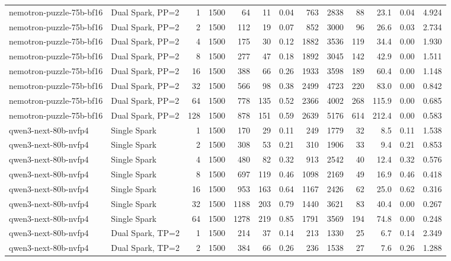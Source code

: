 \begin{tabular}{l l r r r r r r r r r r r}
nemotron-puzzle-75b-bf16 & Dual Spark, PP=2 & 1 & 1500 & 64\rlap{$^\dagger$} & 11 & 0.04 & 763 & 2838 & 88 & 23.1 & 0.04 & 4.924 \\
nemotron-puzzle-75b-bf16 & Dual Spark, PP=2 & 2 & 1500 & 112 & 19 & 0.07 & 852 & 3000 & 96 & 26.6 & 0.03 & 2.734 \\
nemotron-puzzle-75b-bf16 & Dual Spark, PP=2 & 4 & 1500 & 175 & 30 & 0.12 & 1882 & 3536 & 119 & 34.4 & 0.00 & 1.930 \\
nemotron-puzzle-75b-bf16 & Dual Spark, PP=2 & 8 & 1500 & 277 & 47 & 0.18 & 1892 & 3045 & 142 & 42.9 & 0.00 & 1.511 \\
nemotron-puzzle-75b-bf16 & Dual Spark, PP=2 & 16 & 1500 & 388 & 66 & 0.26 & 1933 & 3598 & 189 & 60.4 & 0.00 & 1.148 \\
nemotron-puzzle-75b-bf16 & Dual Spark, PP=2 & 32 & 1500 & 566 & 98 & 0.38 & 2499 & 4723 & 220 & 83.0 & 0.00 & 0.842 \\
nemotron-puzzle-75b-bf16 & Dual Spark, PP=2 & 64 & 1500 & 778 & 135 & 0.52 & 2366 & 4002 & 268 & 115.9 & 0.00 & 0.685 \\
nemotron-puzzle-75b-bf16 & Dual Spark, PP=2 & 128 & 1500 & 878 & 151 & 0.59 & 2639 & 5176 & 614 & 212.4 & 0.00 & 0.583 \\
\addlinespace
qwen3-next-80b-nvfp4 & Single Spark & 1 & 1500 & 170 & 29 & 0.11 & 249 & 1779 & 32 & 8.5 & 0.11 & 1.538 \\
qwen3-next-80b-nvfp4 & Single Spark & 2 & 1500 & 308 & 53 & 0.21 & 310 & 1906 & 33 & 9.4 & 0.21 & 0.853 \\
qwen3-next-80b-nvfp4 & Single Spark & 4 & 1500 & 480 & 82 & 0.32 & 913 & 2542 & 40 & 12.4 & 0.32 & 0.576 \\
qwen3-next-80b-nvfp4 & Single Spark & 8 & 1500 & 697 & 119 & 0.46 & 1098 & 2169 & 49 & 16.9 & 0.46 & 0.418 \\
qwen3-next-80b-nvfp4 & Single Spark & 16 & 1500 & 953 & 163 & 0.64 & 1167 & 2426 & 62 & 25.0 & 0.62 & 0.316 \\
qwen3-next-80b-nvfp4 & Single Spark & 32 & 1500 & 1188 & 203 & 0.79 & 1440 & 3621 & 83 & 40.4 & 0.00 & 0.267 \\
qwen3-next-80b-nvfp4 & Single Spark & 64 & 1500 & 1278 & 219 & 0.85 & 1791 & 3569 & 194 & 74.8 & 0.00 & 0.248 \\
\addlinespace
qwen3-next-80b-nvfp4 & Dual Spark, TP=2 & 1 & 1500 & 214 & 37 & 0.14 & 213 & 1330 & 25 & 6.7 & 0.14 & 2.349 \\
qwen3-next-80b-nvfp4 & Dual Spark, TP=2 & 2 & 1500 & 384 & 66 & 0.26 & 236 & 1538 & 27 & 7.6 & 0.26 & 1.288 \\

\end{tabular}
